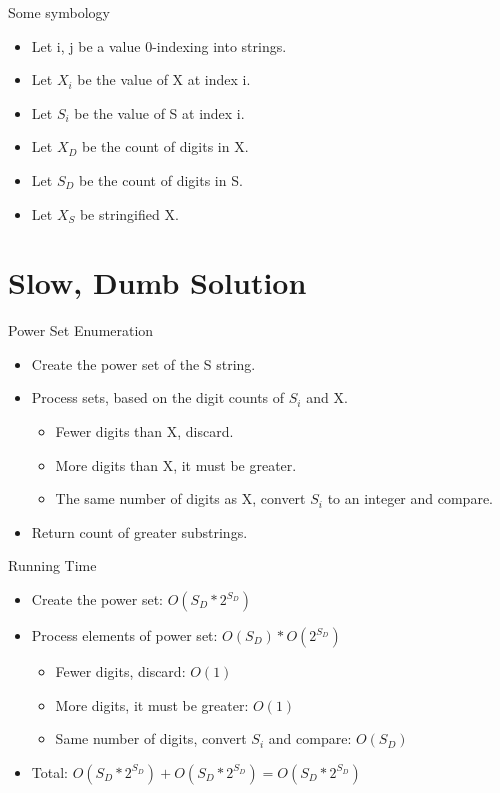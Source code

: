 \documentclass[10pt]{beamer}
\begin{document}
\begin{frame}{Some symbology}
  \Large
  \begin{itemize} %
    \item Let i, j be a value 0-indexing into strings.
    \item Let $X_{i}$ be the value of X at index i.
    \item Let $S_{i}$ be the value of S at index i.
    \item Let $X_{D}$ be the count of digits in X.
    \item Let $S_{D}$ be the count of digits in S.
    \item Let $X_{S}$ be stringified X.
  \end{itemize}
\end{frame}

\section{Slow, Dumb Solution}

\begin{frame}{Power Set Enumeration}
  \Large
  \begin{itemize} %
    \item Create the power set of the S string.
    \item Process sets, based on the digit counts of $S_i$ and X.
      \begin{itemize}
        \large
        \item Fewer digits than X, discard.
        \item More digits than X, it must be greater.
        \item The same number of digits as X, convert $S_i$ to an integer and compare.
      \end{itemize}
    \item Return count of greater substrings.
  \end{itemize}
\end{frame}

\begin{frame}{Running Time}
  \Large
  \begin{itemize} %
    \item Create the power set: $O(S_{D}*2^{S_{D}})$
    \item Process elements of power set: $O(S_{D}) * O(2^{S_{D}})$
      \begin{itemize}
        \large
        \item Fewer digits, discard: $O(1)$
        \item More digits, it must be greater: $O(1)$
        \item Same number of digits, convert $S_i$ and compare: $O(S_{D})$
      \end{itemize}
    \item Total: $O(S_{D}*2^{S_{D}}) + O(S_{D}*2^{S_{D}}) = O(S_{D}*2^{S_{D}})$
  \end{itemize}
\end{frame}
\end{document}
